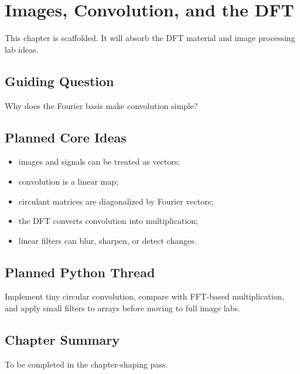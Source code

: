 \chapter{Images, Convolution, and the DFT}
\label{ch:images-convolution-dft}

\begin{draftbox}
This chapter is scaffolded. It will absorb the DFT material and image
processing lab ideas.
\end{draftbox}

\section{Guiding Question}

Why does the Fourier basis make convolution simple?

\section{Planned Core Ideas}

\begin{itemize}
  \item images and signals can be treated as vectors;
  \item convolution is a linear map;
  \item circulant matrices are diagonalized by Fourier vectors;
  \item the DFT converts convolution into multiplication;
  \item linear filters can blur, sharpen, or detect changes.
\end{itemize}

\section{Planned Python Thread}

Implement tiny circular convolution, compare with FFT-based multiplication, and
apply small filters to arrays before moving to full image labs.

\section*{Chapter Summary}

To be completed in the chapter-shaping pass.



